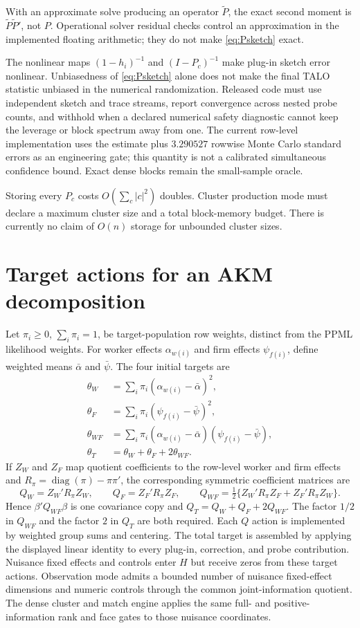 \documentclass[11pt]{article}
\newcommand{\diag}{\operatorname{diag}}
\begin{document}
With an approximate solve producing an operator $\widetilde P$, the exact
second moment is $\widetilde P\widetilde P'$, not $P$.  Operational solver
residual checks control an approximation in the implemented floating
arithmetic; they do not make
\eqref{eq:Psketch} exact.

The nonlinear maps $(1-h_i)^{-1}$ and $(I-P_c)^{-1}$ make plug-in sketch error
nonlinear.  Unbiasedness of \eqref{eq:Psketch} alone does not make the final
TALO statistic unbiased in the numerical randomization.  Released code must
use independent sketch and trace streams, report convergence across nested
  probe counts, and withhold when a declared numerical safety diagnostic cannot
  keep the leverage or block spectrum away from one.  The current row-level
  implementation uses the estimate plus $3.290527$ rowwise Monte Carlo standard
  errors as an engineering gate; this quantity is not a calibrated simultaneous
  confidence bound.  Exact dense blocks remain the small-sample oracle.

Storing every $P_c$ costs $O(\sum_c|c|^2)$ doubles.  Cluster production mode
must declare a maximum cluster size and a total block-memory budget.  There is
currently no claim of $O(n)$ storage for unbounded cluster sizes.

\section{Target actions for an AKM decomposition}

Let $\pi_i\ge0$, $\sum_i\pi_i=1$, be target-population row weights, distinct
from the PPML likelihood weights.  For worker effects $\alpha_{w(i)}$ and firm
effects $\psi_{f(i)}$, define weighted means $\bar\alpha$ and $\bar\psi$.  The
four initial targets are
\begin{align*}
 \theta_W&=\sum_i\pi_i(\alpha_{w(i)}-\bar\alpha)^2,\\
 \theta_F&=\sum_i\pi_i(\psi_{f(i)}-\bar\psi)^2,\\
 \theta_{WF}&=\sum_i\pi_i(\alpha_{w(i)}-\bar\alpha)
                         (\psi_{f(i)}-\bar\psi),\\
 \theta_T&=\theta_W+\theta_F+2\theta_{WF}.
\end{align*}
If $Z_W$ and $Z_F$ map quotient coefficients to the row-level worker and firm
effects and $R_\pi=\diag(\pi)-\pi\pi'$, the corresponding symmetric coefficient
matrices are
\[
 Q_W=Z_W'R_\pi Z_W,\qquad Q_F=Z_F'R_\pi Z_F,\qquad
 Q_{WF}=\tfrac12\{Z_W'R_\pi Z_F+Z_F'R_\pi Z_W\}.
\]
Hence $\beta'Q_{WF}\beta$ is one covariance copy and
$Q_T=Q_W+Q_F+2Q_{WF}$.  The factor $1/2$ in $Q_{WF}$ and the factor $2$ in
$Q_T$ are both required.
Each $Q$ action is implemented by weighted group sums and centering.  The total
target is assembled by applying the displayed linear identity to every
plug-in, correction, and probe contribution. Nuisance fixed effects and
controls enter $H$ but receive zeros from these target actions. Observation
mode admits a bounded number of nuisance fixed-effect dimensions and numeric
controls through the common joint-information quotient. The dense cluster and
match engine applies the same full- and positive-information rank and face
gates to those nuisance coordinates.
\end{document}
